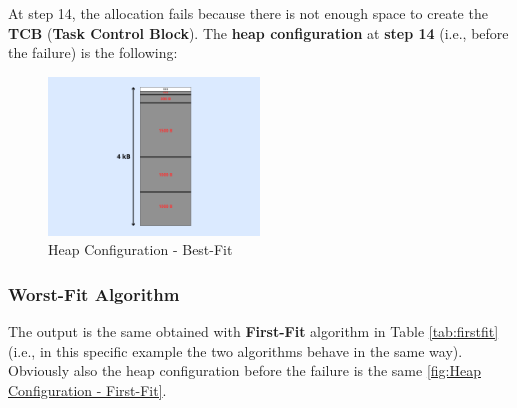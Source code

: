 At step 14, the allocation fails because there is not enough space to create the \textbf{TCB} (\textbf{Task Control Block}).
The \textbf{heap configuration} at \textbf{step 14} (i.e., before the failure) is the following:

\begin{figure}[H]
    \centering
    \includegraphics[width=0.5\textwidth]{img/best.png}
    \caption{Heap Configuration - Best-Fit}
    \label{fig:Heap Configuration - Best-Fit}
\end{figure}

\subsubsection{Worst-Fit Algorithm}
The output is the same obtained with \textbf{First-Fit} algorithm in Table \ref{tab:firstfit} (i.e., in this specific example the two algorithms behave in the same way). Obviously also the heap configuration before the failure is the same \ref{fig:Heap Configuration - First-Fit}.

